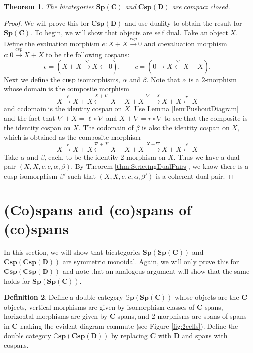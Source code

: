 \documentclass[11pt]{amsart}
\newcommand{\cat}[1]{\mathbf{#1}}
\newcommand{\from}{\colon}
\newcommand{\xto}[1]{\xrightarrow{#1}}
\newcommand{\tocospan}{\xrightarrow{\mathit{csp}}}
\newcommand{\bispmap}[1]{\mathbf{Sp(#1)}}
\newcommand{\bicspmap}[1]{\mathbf{Csp(#1)}}
\newcommand{\bispsp}[1]{\mathbf{Sp(Sp(#1))}}
\newcommand{\dblspsp}[1]{\mathbb{S}\mathbf{p(Sp(#1))}}
\newcommand{\bicspcsp}[1]{\mathbf{Csp(Csp(#1))}}
\newcommand{\dblcspcsp}[1]{\mathbb{C}\mathbf{sp(Csp(#1))}}
\newtheorem{thm}{Theorem}[section]
\theoremstyle{remark}
\theoremstyle{definition}
\newtheorem{defn}[thm]{Definition}
\begin{document}
\begin{thm}
	\label{thm:SpansMapsAreCCBicat}
	The bicategories $\bispmap{C}$ and $\bicspmap{D}$ are compact closed.
\end{thm}

\begin{proof}
	We will prove this for $\bicspmap{D}$ and use duality to obtain the result for $\bispmap{C}$. To begin, we will show that objects are self dual. Take an object $X$.  Define the evaluation morphism $e \from X + X \tocospan 0$ and coevaluation morphism $c \from 0 \tocospan X+X$ to be the following cospans:
	\[
		e = (X+X \xto{\nabla} X \gets 0), \quad \quad 
		c = (0 \to X \xleftarrow{\nabla} X+X).
	\]
	Next we define the cusp isomorphisms, $\alpha$ and $\beta$.
	Note that $\alpha$ is a $2$-morphism whose domain is the composite morphism
	\[
		X \xto{\ell}
		X+X \xleftarrow{X+\nabla}
		X+X+X \xto{\nabla +X}
		X+X \xleftarrow{r}
		X
	\]
	and codomain is the identity cospan on $X$.  Use Lemma \ref{lem:PushoutDiagram} and the fact that $\nabla+X = \ell \circ \nabla$ and $X + \nabla = r \circ \nabla$ to see that the composite is the identity cospan on $X$.  The codomain of $\beta$ is also the identity cospan on $X$, which is obtained as the composite morphism
	\[
		X \xto{r}
		X+X \xleftarrow{\nabla+X}
		X+X+X \xto{X+\nabla}
		X+X \xleftarrow{\ell}
		X
	\]
	Take $\alpha$ and $\beta$, each, to be the identity $2$-morphism on $X$. Thus we have a dual pair $(X,X,e,c,\alpha,\beta)$. By Theorem \ref{thm:StrictingDualPairs}, we know there is a cusp isomorphism $\beta'$ such that $(X,X,e,c,\alpha,\beta')$ is a coherent dual pair.  
\end{proof}

\section{(Co)spans and (co)spans of (co)spans}                  
\label{sec:SpansSpans}

In this section, we will show that bicategories $\bispsp{C}$ and $\bicspcsp{D}$ are symmetric monoidal. Again, we will only prove this for $\bicspcsp{D}$ and note that an analogous argument will show that the same holds for $\bispsp{C}$.  

\begin{defn}
\label{def:DblCatSpanSpan}
	Define a double category $\dblspsp{C}$ whose objects are the $\cat{C}$-objects, vertical morphisms are given by isomorphism classes of $\cat{C}$-spans, horizontal morphisms are given by $\cat{C}$-spans, and $2$-morphisms are spans of spans in $\cat{C}$ making the evident diagram commute (see Figure \ref{fig:2cells}). Define the double category $\dblcspcsp{D}$ by replacing $\cat{C}$ with $\cat{D}$ and spans with cospans.  
\end{defn}
\end{document}
